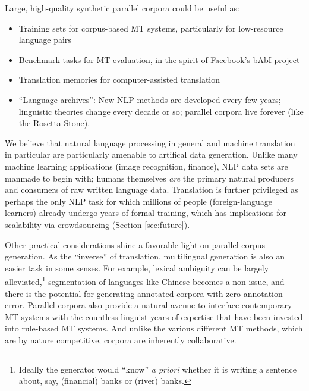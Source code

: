 Large, high-quality synthetic parallel corpora could be useful as:

\begin{itemize}
\item Training sets for corpus-based MT systems, particularly for low-resource language pairs
\item Benchmark tasks for MT evaluation, in the spirit of Facebook's bAbI project 
\item Translation memories for computer-assisted translation
\item ``Language archives'': New NLP methods are developed every few years; linguistic theories change every decade or so; parallel corpora live forever (like the Rosetta Stone).
\end{itemize}

We believe that natural language processing in general and machine translation in particular are particularly amenable to artifical data generation. 
Unlike many machine learning applications (image recognition, finance), NLP data sets are manmade to begin with; humans themselves {\em are} the primary natural producers and consumers of raw written language data.
Translation is further privileged as perhaps the only NLP task for which millions of people (foreign-language learners) already undergo years of formal training, which has implications for scalability via crowdsourcing (Section \ref{sec:future}).

Other practical considerations shine a favorable light on parallel corpus generation.
As the ``inverse'' of translation, multilingual generation is also an easier task in some senses.
For example, lexical ambiguity can be largely alleviated,\footnote{
    Ideally the generator would ``know'' {\em a priori} whether it is writing a sentence about, say, (financial) banks or (river) banks.
} segmentation of languages like Chinese  becomes a non-issue, and there is the potential for generating annotated corpora with zero annotation error.
Parallel corpora also provide a natural avenue to interface contemporary MT systems with the countless linguist-years of expertise that have been invested into rule-based MT systems. %
And unlike the various different MT methods, which are by nature competitive, corpora are inherently collaborative.

